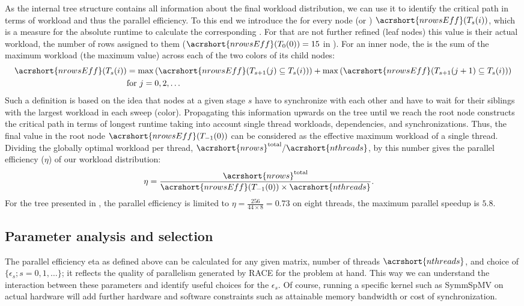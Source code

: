 As the internal tree structure contains all information about the
final workload distribution, we can use it to identify the critical
path in terms of workload and thus the parallel
efficiency. To this end we introduce the \effRow for every node
(or \levelGroup) $\acrshort{nrowsEff}(T_s(i))$, which is a measure for
the absolute runtime to calculate the
corresponding \levelGroup. For \levelGroups that are not further
refined (leaf nodes) this value is their actual workload, \ie the
number of rows assigned to them ($\acrshort{nrowsEff}(T_0(0)) = 15$
in ). For an inner node, the \effRow is the
sum of the maximum workload (\ie the maximum \effRow value) across each of
the two colors of its child nodes:
\begin{align*}
\acrshort{nrowsEff}(T_s(i)) &= \max\left(\acrshort{nrowsEff}(T_{s+1}(j) \subseteq T_s(i))\right) + \max\left(\acrshort{nrowsEff}(T_{s+1}(j+1) \subseteq T_s(i))\right)\\
 & \text{for } j=0,2,\ldots
\end{align*}
Such a definition is based on the idea that nodes at a given stage $s$
have to synchronize with each other and have to wait for their
siblings with the largest workload in each sweep (color). Propagating
this information upwards on the tree until we reach the root node
constructs the critical path in terms of longest runtime taking into
account single thread workloads, dependencies, and
synchronizations. Thus, the final value in the root node
$\acrshort{nrowsEff}(T_{-1}(0))$ can be considered as the effective
maximum workload of a single thread. Dividing the globally optimal
workload per thread,
${\acrshort{nrows}^\mathrm{total}}/{\acrshort{nthreads}}$, by
this number gives the parallel efficiency ($\eta$) of our workload
distribution:
\begin{align*}
	\eta &= \frac{ \acrshort{nrows}^\mathrm{total}} {\acrshort{nrowsEff}(T_{-1}(0)) \times \acrshort{nthreads}}. 
\end{align*}
For the tree presented in , the parallel
efficiency is limited to $\eta=\frac{256}{44 \times 8 } = 0.73$ on
eight threads, \ie the maximum parallel speedup is $5.8$.

\subsection{Parameter analysis and selection}
\label{subsec:param_analysis}
The parallel efficiency \acrshort{eta} as defined above can be calculated for
any given matrix, number of threads $\acrshort{nthreads}$, and choice of
$\{\epsilon_s; s=0,1,\ldots\}$; it reflects the quality of parallelism generated
by \acrshort{RACE} for the problem at hand.  This way we can understand the
interaction between these parameters and identify useful choices for
the $\epsilon_s$. Of course, running a specific kernel such
as \acrshort{SymmSpMV} on actual hardware will add further hardware and software
constraints such as attainable memory bandwidth or cost of synchronization.

